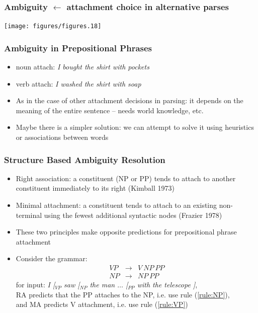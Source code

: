 \begin{frame}[fragile]
\frametitle{Ambiguity $\leftarrow$ attachment choice in alternative parses}
\texttt{[image: figures/figures.18]}
\end{frame}

\begin{frame}
\frametitle{Ambiguity in Prepositional Phrases}
\begin{itemize}
\item<1-> noun attach: {\em I bought the shirt with pockets}
\item<2-> verb attach: {\em I washed the shirt with soap}
\item<3-> As in the case of other attachment decisions in parsing: it depends on the meaning of the entire sentence -- needs world knowledge, etc.
\item<4-> Maybe there is a simpler solution: we can attempt to solve it using heuristics or associations between words
\end{itemize}

\end{frame}

\begin{frame}
\frametitle{Structure Based Ambiguity Resolution}
\begin{itemize}
  \item Right association: a constituent (NP or PP) tends to attach to
  another constituent immediately to its right (Kimball 1973)
  \item Minimal attachment: a constituent tends to attach to an
  existing non-terminal using the fewest additional syntactic nodes
  (Frazier 1978)
  \item These two principles make opposite predictions for
  prepositional phrase attachment
  \item Consider the grammar:
\begin{eqnarray}
VP &\rightarrow& V\ NP\ PP \label{rule:VP}\\
NP &\rightarrow& NP\ PP \label{rule:NP}
\end{eqnarray}  
  for input: {\em I [$_{VP}$ saw [$_{NP}$ the man $\ldots$ [$_{PP}$ with
  the telescope ]}, \\
  RA predicts that the PP attaches to the NP, i.e. use rule (\ref{rule:NP}), \\
  and MA predicts V attachment, i.e. use rule (\ref{rule:VP})
\end{itemize}

\end{frame}

